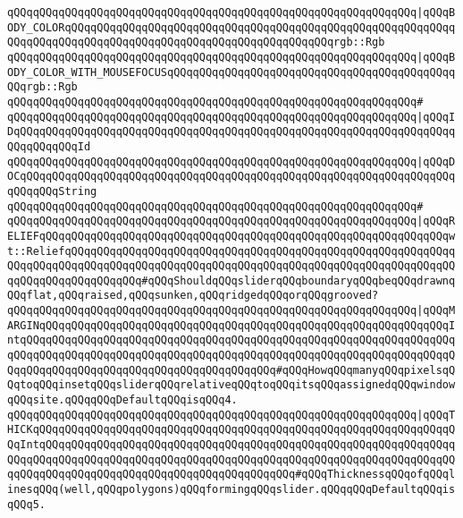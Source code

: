 \verb|qQQqqQQqqQQqqQQqqQQqqQQqqQQqqQQqqQQqqQQqqQQqqQQqqQQqqQQqqQQqqQQq|\verb#|qQQqBODY_COLORqQQqqQQqqQQqqQQqqQQqqQQqqQQqqQQqqQQqqQQqqQQqqQQqqQQqqQQqqQQqqQQqqQQqqQQqqQQqqQQqqQQqqQQqqQQqqQQqqQQqqQQqqQQqqQQqrgb::Rgb#\newline
\verb|qQQqqQQqqQQqqQQqqQQqqQQqqQQqqQQqqQQqqQQqqQQqqQQqqQQqqQQqqQQqqQQq|\verb#|qQQqBODY_COLOR_WITH_MOUSEFOCUSqQQqqQQqqQQqqQQqqQQqqQQqqQQqqQQqqQQqqQQqqQQqqQQqrgb::Rgb#\newline
\verb|qQQqqQQqqQQqqQQqqQQqqQQqqQQqqQQqqQQqqQQqqQQqqQQqqQQqqQQqqQQqqQQq#|\newline
\verb|qQQqqQQqqQQqqQQqqQQqqQQqqQQqqQQqqQQqqQQqqQQqqQQqqQQqqQQqqQQqqQQq|\verb#|qQQqIDqQQqqQQqqQQqqQQqqQQqqQQqqQQqqQQqqQQqqQQqqQQqqQQqqQQqqQQqqQQqqQQqqQQqqQQqqQQqqQQqId#\newline
\verb|qQQqqQQqqQQqqQQqqQQqqQQqqQQqqQQqqQQqqQQqqQQqqQQqqQQqqQQqqQQqqQQq|\verb#|qQQqDOCqQQqqQQqqQQqqQQqqQQqqQQqqQQqqQQqqQQqqQQqqQQqqQQqqQQqqQQqqQQqqQQqqQQqqQQqqQQqString#\newline
\verb|qQQqqQQqqQQqqQQqqQQqqQQqqQQqqQQqqQQqqQQqqQQqqQQqqQQqqQQqqQQqqQQq#|\newline
\verb|qQQqqQQqqQQqqQQqqQQqqQQqqQQqqQQqqQQqqQQqqQQqqQQqqQQqqQQqqQQqqQQq|\verb#|qQQqRELIEFqQQqqQQqqQQqqQQqqQQqqQQqqQQqqQQqqQQqqQQqqQQqqQQqqQQqqQQqqQQqqQQqwt::ReliefqQQqqQQqqQQqqQQqqQQqqQQqqQQqqQQqqQQqqQQqqQQqqQQqqQQqqQQqqQQqqQQqqQQqqQQqqQQqqQQqqQQqqQQqqQQqqQQqqQQqqQQqqQQqqQQqqQQqqQQqqQQqqQQqqQQqqQQqqQQqqQQqqQQqqQQq#\verb|#qQQqShouldqQQqsliderqQQqboundaryqQQqbeqQQqdrawnqQQqflat,qQQqraised,qQQqsunken,qQQqridgedqQQqorqQQqgrooved?|\newline
\verb|qQQqqQQqqQQqqQQqqQQqqQQqqQQqqQQqqQQqqQQqqQQqqQQqqQQqqQQqqQQqqQQq|\verb#|qQQqMARGINqQQqqQQqqQQqqQQqqQQqqQQqqQQqqQQqqQQqqQQqqQQqqQQqqQQqqQQqqQQqqQQqIntqQQqqQQqqQQqqQQqqQQqqQQqqQQqqQQqqQQqqQQqqQQqqQQqqQQqqQQqqQQqqQQqqQQqqQQqqQQqqQQqqQQqqQQqqQQqqQQqqQQqqQQqqQQqqQQqqQQqqQQqqQQqqQQqqQQqqQQqqQQqqQQqqQQqqQQqqQQqqQQqqQQqqQQqqQQqqQQqqQQq#\verb|#qQQqHowqQQqmanyqQQqpixelsqQQqtoqQQqinsetqQQqsliderqQQqrelativeqQQqtoqQQqitsqQQqassignedqQQqwindowqQQqsite.qQQqqQQqDefaultqQQqisqQQq4.|\newline
\verb|qQQqqQQqqQQqqQQqqQQqqQQqqQQqqQQqqQQqqQQqqQQqqQQqqQQqqQQqqQQqqQQq|\verb#|qQQqTHICKqQQqqQQqqQQqqQQqqQQqqQQqqQQqqQQqqQQqqQQqqQQqqQQqqQQqqQQqqQQqqQQqqQQqIntqQQqqQQqqQQqqQQqqQQqqQQqqQQqqQQqqQQqqQQqqQQqqQQqqQQqqQQqqQQqqQQqqQQqqQQqqQQqqQQqqQQqqQQqqQQqqQQqqQQqqQQqqQQqqQQqqQQqqQQqqQQqqQQqqQQqqQQqqQQqqQQqqQQqqQQqqQQqqQQqqQQqqQQqqQQqqQQqqQQq#\verb|#qQQqThicknessqQQqofqQQqlinesqQQq(well,qQQqpolygons)qQQqformingqQQqslider.qQQqqQQqDefaultqQQqisqQQq5.|\newline
